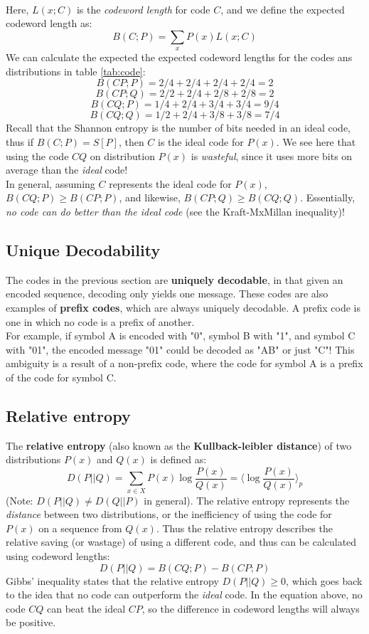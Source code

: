 \documentclass[12pt]{article}
\begin{document}
\\Here, $L(x; C)$ is the \textit{codeword length} for code $C$, and we define the expected codeword length as:
$$B(C;P) = \sum_xP(x)L(x;C)$$
We can calculate the expected the expected codeword lengths for the codes ans distributions in table \ref{tab:code}:
$$B(CP;P) = 2/4 + 2/4 + 2/4 + 2/4 = 2$$
$$B(CP;Q) = 2/2 + 2/4 + 2/8 + 2/8 = 2$$
$$B(CQ;P) = 1/4 + 2/4 + 3/4 + 3/4 = 9/4$$
$$B(CQ;Q) = 1/2 + 2/4 + 3/8 + 3/8 = 7/4$$
Recall that the Shannon entropy is the number of bits needed in an ideal code, thus if $B(C;P) = S[P]$, then $C$ is the ideal code for $P(x)$. We see here that using the code $CQ$ on distribution $P(x)$ is \textit{wasteful}, since it uses more bits on average than the \textit{ideal} code!\\[10pt]
In general, assuming $C$ represents the ideal code for $P(x)$, $B(CQ; P) \geq B(CP;P)$, and likewise, $B(CP;Q) \geq B(CQ;Q)$. Essentially, \textit{no code can do better than the ideal code} (see the Kraft-MxMillan inequality)!
\subsection{Unique Decodability}
The codes in the previous section are \textbf{uniquely decodable}, in that given an encoded sequence, decoding only yields one message. These codes are also examples of \textbf{prefix codes}, which are always uniquely decodable. A prefix code is one in which no code is a prefix of another.\\[10pt]
For example, if symbol A is encoded with "0", symbol B with "1", and symbol C with "01", the encoded message "01" could be decoded as "AB" or just "C"! This ambiguity is a result of a non-prefix code, where the code for symbol A is a prefix of the code for symbol C.
\subsection{Relative entropy}
The \textbf{relative entropy} (also known as the \textbf{Kullback-leibler distance}) of two distributions $P(x)$ and $Q(x)$ is defined as:
$$D(P||Q) = \sum_{x\in X}P(x)\log\frac{P(x)}{Q(x)} = \langle\log\frac{P(x)}{Q(x)}\rangle_p$$
(Note: $D(P||Q) \neq D(Q||P)$ in general). The relative entropy represents the \textit{distance} between two distributions, or the inefficiency of using the code for $P(x)$ on a sequence from $Q(x)$. Thus the relative entropy describes the relative saving (or wastage) of using a different code, and thus can be calculated using codeword lengths:
$$D(P||Q) = B(CQ;P) - B(CP;P)$$
Gibbs' inequality states that the relative entropy $D(P||Q) \geq 0$, which goes back to the idea that no code can outperform the \textit{ideal} code. In the equation above, no code $CQ$ can beat the ideal $CP$, so the difference in codeword lengths will always be positive.
\end{document}
